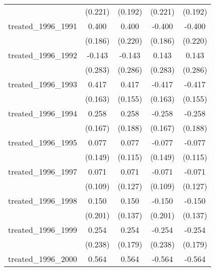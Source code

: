 {\begin{tabular}{l*{4}{c}}
            &     (0.221)         &     (0.192)         &     (0.221)         &     (0.192)         \\
[1em]
treated\_1996\_1991&       0.400\sym{*}  &       0.400         &      -0.400\sym{*}  &      -0.400         \\
            &     (0.186)         &     (0.220)         &     (0.186)         &     (0.220)         \\
[1em]
treated\_1996\_1992&      -0.143         &      -0.143         &       0.143         &       0.143         \\
            &     (0.283)         &     (0.286)         &     (0.283)         &     (0.286)         \\
[1em]
treated\_1996\_1993&       0.417\sym{*}  &       0.417\sym{**} &      -0.417\sym{*}  &      -0.417\sym{**} \\
            &     (0.163)         &     (0.155)         &     (0.163)         &     (0.155)         \\
[1em]
treated\_1996\_1994&       0.258         &       0.258         &      -0.258         &      -0.258         \\
            &     (0.167)         &     (0.188)         &     (0.167)         &     (0.188)         \\
[1em]
treated\_1996\_1995&       0.077         &       0.077         &      -0.077         &      -0.077         \\
            &     (0.149)         &     (0.115)         &     (0.149)         &     (0.115)         \\
[1em]
treated\_1996\_1997&       0.071         &       0.071         &      -0.071         &      -0.071         \\
            &     (0.109)         &     (0.127)         &     (0.109)         &     (0.127)         \\
[1em]
treated\_1996\_1998&       0.150         &       0.150         &      -0.150         &      -0.150         \\
            &     (0.201)         &     (0.137)         &     (0.201)         &     (0.137)         \\
[1em]
treated\_1996\_1999&       0.254         &       0.254         &      -0.254         &      -0.254         \\
            &     (0.238)         &     (0.179)         &     (0.238)         &     (0.179)         \\
[1em]
treated\_1996\_2000&       0.564\sym{**} &       0.564\sym{*}  &      -0.564\sym{**} &      -0.564\sym{*}  \\

\end{tabular}}
